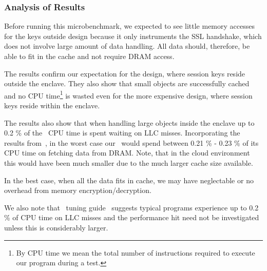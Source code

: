 \documentclass[../../../main.tex]{subfiles}
\begin{document}
\subsubsection*{Analysis of Results}
Before running this microbenchmark, we expected to see little memory
accesses for the keys outside design because it only instruments the SSL
handshake, which does not involve large amount of data handling. All data
should, therefore, be able to fit in the cache and not require DRAM access.

The results confirm our expectation for the design, where session keys reside
outside the enclave. They also show that small objects are successfully cached
and no CPU time\footnote{By CPU time we mean the total number of instructions
required to execute our program during a test.} is wasted even for the more
expensive design, where session keys reside within the enclave.

The results also show that when handling large objects inside the enclave up
to 0.2 \% of the \enclavemodel~CPU time is spent waiting on LLC misses.
Incorporating the results from~\cite{REFERENCE}, in the worst case our
\enclaveprogram~would spend between 0.21 \% - 0.23 \% of its CPU time on
fetching data from DRAM. Note, that in the cloud environment this would have
been much smaller due to the much larger cache size available.

In the best case, when all the data fits in cache, we may have neglectable or
no overhead from memory encryption/decryption.

We also note that \Intel~tuning guide~\cite{intel-eqn} suggests typical
programs experience up to 0.2 \% of CPU time on LLC misses and the performance
hit need not be investigated unless this is considerably larger.
\end{document}
